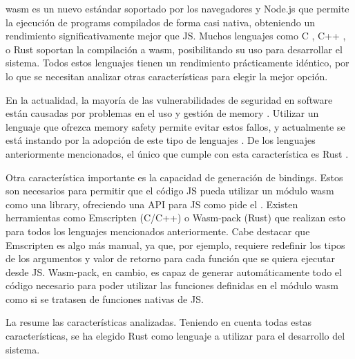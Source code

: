 \gls{wasm} \parencite{wasm} es un nuevo estándar soportado por los navegadores y
Node.js que permite la ejecución de \glspl{program} compilados de forma casi
nativa, obteniendo un rendimiento significativamente mejor que \gls{JS}. Muchos
lenguajes como C \parencite{C}, C++ \parencite{cpp}, o Rust \parencite{Rust}
soportan la compilación a \gls{wasm}, posibilitando su uso para desarrollar el
sistema. Todos estos lenguajes tienen un rendimiento prácticamente idéntico, por
lo que se necesitan analizar otras características para elegir la mejor opción.

En la actualidad, la mayoría de las vulnerabilidades de seguridad en software
están causadas por problemas en el uso y gestión de \gls{memory}
\parencite{microsoft-memory-safety} \parencite{mozilla-memory-safety}. Utilizar
un lenguaje que ofrezca \gls{memory safety} permite evitar estos fallos, y
actualmente se está instando por la adopción de este tipo de lenguajes
\parencite{CISA-memory-safety} \parencite{whitehouse-memory-safety}. De los
lenguajes anteriormente mencionados, el único que cumple con esta característica
es Rust \parencite{C-memory-safety}. %

Otra característica importante es la capacidad de generación de \glspl{binding}.
Estos son necesarios para permitir que el código \gls{JS} pueda utilizar un
módulo \gls{wasm} como una \gls{library}, ofreciendo una \gls{API} para \gls{JS}
como pide el . Existen herramientas como Emscripten (C/C++)
\parencite{Emscripten} o Wasm-pack (Rust) \parencite{Wasm-pack} que realizan
esto para todos los lenguajes mencionados anteriormente. Cabe destacar que
Emscripten es algo más manual, ya que, por ejemplo, requiere redefinir los tipos
de los argumentos y valor de retorno para cada función que se quiera ejecutar
desde \gls{JS}. Wasm-pack, en cambio, es capaz de generar automáticamente todo
el código necesario para poder utilizar las funciones definidas en el módulo
\gls{wasm} como si se tratasen de funciones nativas de \gls{JS}.

La  resume las características analizadas. Teniendo
en cuenta todas estas características, se ha elegido Rust como lenguaje a
utilizar para el desarrollo del sistema.

